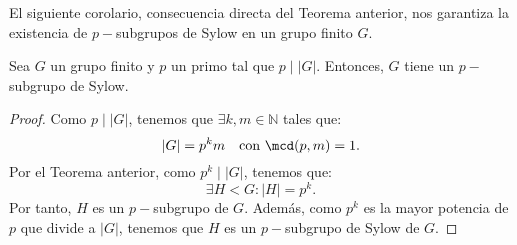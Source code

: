 \begin{ejercicio}
    El siguiente corolario, consecuencia directa del Teorema anterior, nos garantiza la existencia de \(p-\)subgrupos de Sylow en un grupo finito \(G\).
    \begin{coro}
        Sea \(G\) un grupo finito y \(p\) un primo tal que $p\mid |G|$. Entonces, \(G\) tiene un \(p-\)subgrupo de Sylow.
        \begin{proof}
            Como $p\mid |G|$, tenemos que \(\exists k,m\in \mathbb{N}\) tales que:
            \begin{equation*}
                |G| = p^k m \quad \text{con } \mcd(p, m) = 1.
            \end{equation*}
            Por el Teorema anterior, como \(p^k\mid |G|\), tenemos que:
            \begin{equation*}
                \exists H<G: |H| = p^k.
            \end{equation*}
            Por tanto, \(H\) es un \(p-\)subgrupo de \(G\). Además, como \(p^k\) es la mayor potencia de \(p\) que divide a \(|G|\), tenemos que \(H\) es un \(p-\)subgrupo de Sylow de \(G\).
        \end{proof}
    \end{coro}
\end{ejercicio}


